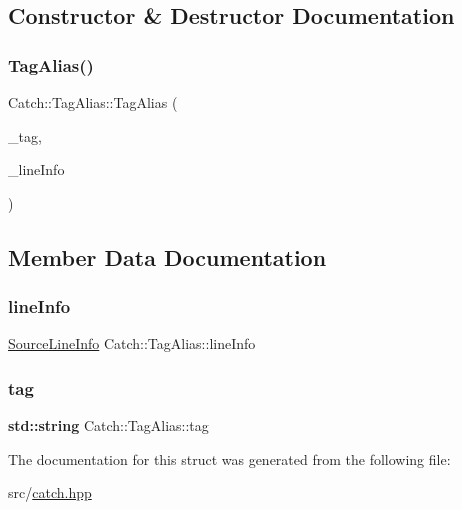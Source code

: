 \subsection{Constructor \& Destructor Documentation}
\mbox{\label{struct_catch_1_1_tag_alias_ae5a030edfbc8e37f28310d4ca599396c}} 
\subsubsection{\texorpdfstring{Tag\+Alias()}{TagAlias()}}
{\footnotesize\ttfamily Catch\+::\+Tag\+Alias\+::\+Tag\+Alias (\begin{DoxyParamCaption}\item[{\textbf{ std\+::string} const \&}]{\+\_\+tag,  }\item[{\hyperlink{struct_catch_1_1_source_line_info}{Source\+Line\+Info}}]{\+\_\+line\+Info }\end{DoxyParamCaption})\hspace{0.3cm}{\ttfamily [inline]}}



\subsection{Member Data Documentation}
\mbox{\label{struct_catch_1_1_tag_alias_a2f51fe0b3c052561275d26b6eb88f702}} 
\subsubsection{\texorpdfstring{line\+Info}{lineInfo}}
{\footnotesize\ttfamily \hyperlink{struct_catch_1_1_source_line_info}{Source\+Line\+Info} Catch\+::\+Tag\+Alias\+::line\+Info}

\mbox{\label{struct_catch_1_1_tag_alias_a950183883ab17c90d0fab16b966b6e2d}} 
\subsubsection{\texorpdfstring{tag}{tag}}
{\footnotesize\ttfamily \textbf{ std\+::string} Catch\+::\+Tag\+Alias\+::tag}



The documentation for this struct was generated from the following file\+:\begin{DoxyCompactItemize}
\item 
src/\hyperlink{catch_8hpp}{catch.\+hpp}\end{DoxyCompactItemize}
